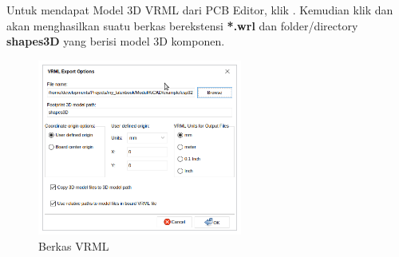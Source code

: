 \documentclass[12pt]{book}
\begin{document}
	Untuk mendapat Model 3D VRML dari PCB Editor, klik .
	Kemudian klik  dan akan menghasilkan suatu berkas berekstensi \textbf{*.wrl}
	dan folder/directory \textbf{shapes3D} yang berisi model 3D komponen.

	\begin{figure}[!ht]
		\centering
		\includegraphics[width=0.6\textwidth]{images/fab/fab_13}
		\caption{Berkas VRML}
	\end{figure}
\end{document}
